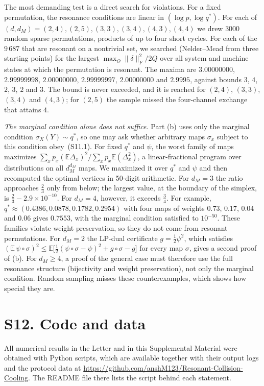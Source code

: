 \documentclass[aps,prl,reprint,superscriptaddress,amsmath,amssymb]{revtex4-2}
\begin{document}
The most demanding test is a direct search for violations. For a fixed permutation, the resonance conditions are linear in
$(\log p,\log q^*)$. For each of $(d,d_M)=(2,4),(2,5),(3,3),(3,4),(4,3),(4,4)$ we drew $3000$ random sparse
permutations, products of up to four short cycles. For each of the $9\,687$ that are resonant on a nontrivial set, we
searched (Nelder--Mead from three starting points) for the largest $\max_\Theta\|\delta\|_F^2/2Q$ over all system and
machine states at which the permutation is resonant. The maxima are $3.00000000$, $2.99999998$, $2.00000000$,
$2.99999997$, $2.00000000$ and $2.9995$, against bounds $3$, $4$, $2$, $3$, $2$ and $3$. The bound is never exceeded,
and it is reached for $(2,4)$, $(3,3)$, $(3,4)$ and $(4,3)$; for $(2,5)$ the sample missed the four-channel exchange
that attains $4$.

\emph{The marginal condition alone does not suffice.} Part (b) uses only the marginal condition $\sigma_X(Y)\sim q^*$,
so one may ask whether arbitrary maps $\sigma_x$ subject to this condition obey~(S11.1). For fixed $q^*$ and $\psi$, the
worst family of maps maximizes $\sum_xp_x(\mathbb E\Delta_x)^2/\sum_xp_x\mathbb E(\Delta_x^2)$, a linear-fractional
program over distributions on all $d_M^{d_M}$ maps. We maximized it over $q^*$ and $\psi$ and then recomputed the
optimal vertices in 50-digit arithmetic. For $d_M=3$ the ratio approaches $\frac23$ only from below; the largest value,
at the boundary of the simplex, is $\frac23-2.9\times10^{-10}$. For $d_M=4$, however, it exceeds $\frac34$. For
example, $q^*\approx(0.4386,0.0878,0.1782,0.2954)$ with four maps of weights $0.73$, $0.17$, $0.04$ and $0.06$ gives
$0.7553$, with the marginal condition satisfied to $10^{-50}$. These families violate weight preservation, so they do not
come from resonant permutations. For $d_M=2$ the LP-dual certificate $g=\frac12\psi^2$, which satisfies
$(\mathbb E\,\psi\circ\sigma)^2\leq\mathbb E\big[\frac12(\psi\circ\sigma-\psi)^2+g\circ\sigma-g\big]$ for every map
$\sigma$, gives a second proof of (b). For $d_M\geq4$, a proof of the general case must therefore use the full resonance
structure (bijectivity and weight preservation), not only the marginal condition. Random sampling misses these
counterexamples, which shows how special they are.

\section{S12. Code and data}
All numerical results in the Letter and in this Supplemental Material were obtained with Python scripts, which are
available together with their output logs and the protocol data at
\url{https://github.com/anshM123/Resonant-Collision-Cooling}. The README file there lists the script behind each
statement.
\end{document}
